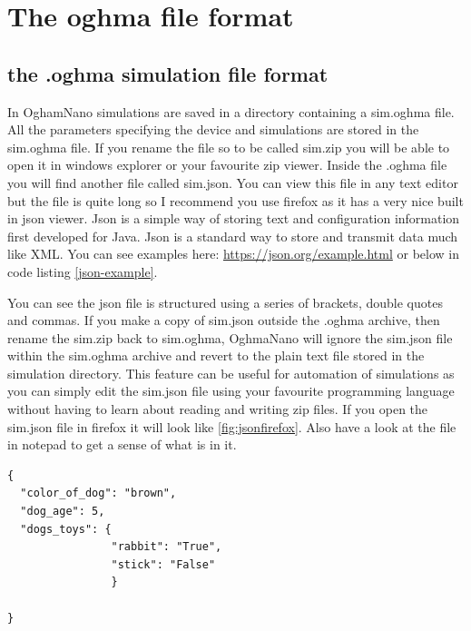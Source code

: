 \chapter{The oghma file format}

\section{the .oghma simulation file format}
\label{sec:fileformat}
In OghamNano simulations are saved in a directory containing a sim.oghma file. All the parameters specifying the device and simulations are stored in the sim.oghma file. If you rename the file so to be called sim.zip you will be able to open it in windows explorer or your favourite zip viewer.  Inside the .oghma file you will find another file called sim.json. You can view this file in any text editor but the file is quite long so I recommend you use firefox as it has a very nice built in json viewer.  Json is a simple way of storing text and configuration information first developed for Java. Json is a standard way to store and transmit data much like XML. You can see examples here: \url{https://json.org/example.html} or below in code listing \ref{json-example}.
\linebreak
\linebreak
\vspace{0pt}
\begin{minipage}[]{0.5\textwidth}
You can see the json file is structured using a series of brackets, double quotes and commas. If you make a copy of sim.json outside the .oghma archive, then rename the sim.zip back to sim.oghma, OghmaNano will ignore the sim.json file within the sim.oghma archive and revert to the plain text file stored in the simulation directory.  This feature can be useful for automation of simulations as you can simply edit the sim.json file using your favourite programming language without having to learn about reading and writing zip files. If you open the sim.json file in firefox it will look like \ref{fig:jsonfirefox}.  Also have a look at the file in notepad to get a sense of what is in it.
\end{minipage}%
\begin{minipage}[]{0.5\linewidth}
\begin{verbatim}
{
  "color_of_dog": "brown",
  "dog_age": 5,
  "dogs_toys": {
				"rabbit": "True",
				"stick": "False"
				}

}
\end{verbatim}
\label{json-example}
\end{minipage}

